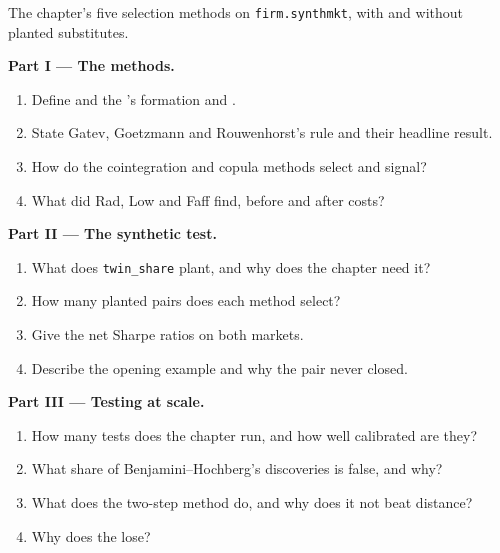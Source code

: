 \begin{problem}\label{pb:s1:pairs-and-baskets:1}
The chapter's five selection methods on \texttt{firm.synthmkt}, with and without planted substitutes.

\medskip\noindent\textbf{Part I --- The methods.}
\begin{enumerate}
\item Define  and the 's formation and .
\item State Gatev, Goetzmann and Rouwenhorst's rule and their headline result.
\item How do the cointegration and copula methods select and signal?
\item What did Rad, Low and Faff find, before and after costs?
\end{enumerate}

\medskip\noindent\textbf{Part II --- The synthetic test.}
\begin{enumerate}[resume]
\item What does \texttt{twin\_share} plant, and why does the chapter need it?
\item How many planted pairs does each method select?
\item Give the net Sharpe ratios on both markets.
\item Describe the opening example and why the pair never closed.
\end{enumerate}

\medskip\noindent\textbf{Part III --- Testing at scale.}
\begin{enumerate}[resume]
\item How many tests does the chapter run, and how well calibrated are they?
\item What share of Benjamini--Hochberg's discoveries is false, and why?
\item What does the two-step method do, and why does it not beat distance?
\item Why does the  lose?
\end{enumerate}


\end{problem}
